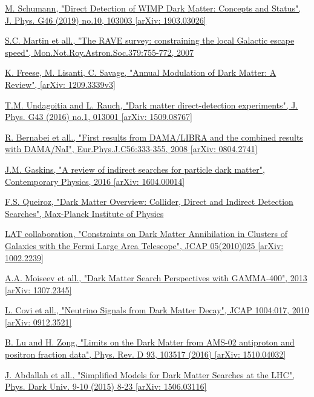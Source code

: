\documentclass[a4paper, 10pt, openright]{report}
\begin{document}
\begin{thebibliography}{1}
\href{https://arxiv.org/abs/1903.03026}{M. Schumann,
"Direct Detection of WIMP Dark Matter: Concepts and Status",
J. Phys. G46 (2019) no.10, 103003 [arXiv: 1903.03026]
}

\href{https://arxiv.org/abs/astro-ph/0611671}{S.C. Martin et all.,
"The RAVE survey: constraining the local Galactic escape speed",
Mon.Not.Roy.Astron.Soc.379:755-772, 2007
}

\href{https://arxiv.org/abs/1209.3339}{K. Freese, M. Lisanti, C. Savage,
"Annual Modulation of Dark Matter: A Review",
[arXiv: 1209.3339v3]
}

\href{https://arxiv.org/abs/1509.08767}{T.M. Undagoitia and L. Rauch,
"Dark matter direct-detection experiments",
J. Phys. G43 (2016) no.1, 013001 [arXiv: 1509.08767]
}

\href{https://arxiv.org/abs/0804.2741}{R. Bernabei et all.,
"First results from DAMA/LIBRA and the combined results with DAMA/NaI",
Eur.Phys.J.C56:333-355, 2008 [arXiv: 0804.2741]
}

\href{https://arxiv.org/pdf/1604.00014}{J.M. Gaskins,
"A review of indirect searches for particle dark matter",
Contemporary Physics, 2016 [arXiv: 1604.00014]
}

\href{http://inspirehep.net/record/1466249/files/1589812_427-436.pdf}{F.S. Queiroz,
"Dark Matter Overview: Collider, Direct and Indirect Detection Searches",
Max-Planck Institute of Physics
}

\href{https://arxiv.org/pdf/1106.3416.pdf}{LAT collaboration,
"Constraints on Dark Matter Annihilation in Clusters of Galaxies with the Fermi Large Area Telescope",
JCAP 05(2010)025 [arXiv: 1002.2239]
}

\href{https://arxiv.org/abs/1307.2345}{A.A. Moiseev et all.,
"Dark Matter Search Perspectives with GAMMA-400",
2013 [arXiv: 1307.2345]
}

\href{https://arxiv.org/abs/0912.3521}{L. Covi et all.,
"Neutrino Signals from Dark Matter Decay",
JCAP 1004:017, 2010 [arXiv: 0912.3521]
}

\href{https://arxiv.org/abs/1510.04032}{B. Lu and H. Zong,
"Limits on the Dark Matter from AMS-02 antiproton and positron fraction data",
Phys. Rev. D 93, 103517 (2016) [arXiv: 1510.04032]
}

\href{https://arxiv.org/abs/1506.03116}{J. Abdallah et all.,
"Simplified Models for Dark Matter Searches at the LHC",
Phys. Dark Univ. 9-10 (2015) 8-23 [arXiv: 1506.03116]
}


\end{thebibliography}
\end{document}
